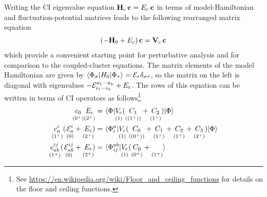 \documentclass[11pt]{article}
\numberwithin{equation}{section}
\begin{document}
\begin{rmk}
\label{rmk:ci-perturbative-analysis}
Writing the CI eigenvalue equation $\mathbf{H}_{\mathrm{c}}\,\mathbf{c}=E_{\mathrm{c}}\,\mathbf{c}$ in terms of model-Hamiltonian and fluctuation-potential matrices leads to the following rearranged matrix equation
\begin{align}
\label{eq:ci-matrix-equation}
  (
  -
    \mathbf{H}_0
  +
    E_{\mathrm{c}}
  )\,
  \mathbf{c}
=
  \mathbf{V}_{\mathrm{c}}\,
  \mathbf{c}
\end{align}
which provide a convenient starting point for perturbative analysis and for comparison to the coupled-cluster equations.
The matrix elements of the model Hamiltonian are given by
$
  \langle\Phi _{\sigma }|H_0|\Phi _{\tau }\rangle
=
  \mathcal{E}_{\tau }
  \delta _{\sigma \tau }
$,
so the matrix on the left is diagonal with eigenvalues
$
-
  \mathcal{E}_{i_1\cdots i_k}^{a_1\cdots a_k}
+
  E_{\mathrm{c}}
$.
The rows of this equation can be written in terms of CI operators as follows\footnote{See \url{https://en.wikipedia.org/wiki/Floor_and_ceiling_functions} for details on the floor and ceiling functions.}
\begin{align}
\label{eq:ci-reference-equation}
  \underset{(0^+)}{\vphantom{(}
  c_0
  }
  \underset{(2^+)}{\vphantom{(}
    E_{\mathrm{c}}
  }
=&\
  \langle\Phi |
  \underset{(1)}{\vphantom{(}
    V_{\mathrm{c}}
  }
    (
    \underset{((1^+))}{\vphantom{(}
      C_1
    }
    +
    \underset{(1^+)}{\vphantom{(}
      C_2
    }
    )
  |\Phi \rangle
\\
\label{eq:ci-singles-equation}
  \underset{(1^+)}{\vphantom{(}
  c_a^i
  }
  (\hspace{1pt}
  \underset{(0)}{\vphantom{(}
    \mathcal{E}_a^i
  }
  +
  \underset{(2^+)}{\vphantom{(}
    E_{\mathrm{c}}
  }
  \hspace{-2pt}
  )
=&\
  \langle\Phi _i^a|
  \underset{(1)}{\vphantom{(}
    V_{\mathrm{c}}
  }
    (
    \underset{((0^+))}{\vphantom{(}
      C_0
    }
    +
    \underset{(1^+)}{\vphantom{(}
      C_1
    }
    +
    \underset{(1^+)}{\vphantom{(}
      C_2
    }
    +
    \underset{(2^+)}{\vphantom{(}
      C_3
    }
    )
  |\Phi \rangle
\\
\label{eq:ci-doubles-equation}
  \underset{(1^+)}{\vphantom{(}
  c_{ab}^{ij}
  }
  (\hspace{1pt}
  \underset{(0)}{\vphantom{(}
    \mathcal{E}_{ab}^{ij}
  }
  +
  \underset{(2^+)}{\vphantom{(}
    E_{\mathrm{c}}
  }
  \hspace{-2pt}
  )
=&\
  \langle\Phi _{ij}^{ab}|
  \underset{(1)}{\vphantom{(}
    V_{\mathrm{c}}
  }
    (
    \underset{(0^+)}{\vphantom{(}
      C_0
    }
    +
    \underset{(1^+)}{\vphantom{(}
}\rangle
\end{align}
\end{rmk}
\end{document}
